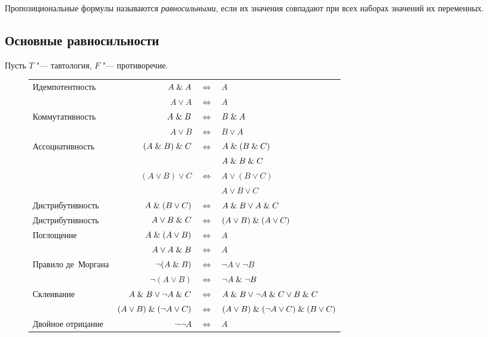 \begin{definition}
	Пропозициональные формулы называются \emph{равносильными}, если их значения совпадают при всех наборах значений их переменных.
\end{definition}

\subsection{Основные равносильности}

Пусть $ T $ "--- тавтология, $ F $ "--- противоречие.

\begin{figure}[!ht]
	\centering
	\begin{tabular}{l | r c l}
		Идемпотентность & $ A \mathrel\& A $ & $ \iff $ & $ A $ \\
						& $ A \vee A $ & $ \iff $ & $ A $ \\
		Коммутативность & $ A \mathrel\& B $ & $ \iff $ & $ B \mathrel\& A $ \\
						& $ A \vee B $ & $ \iff $ & $ B \vee A $ \\
		Ассоциативность & $ (A \mathrel\& B) \mathrel\& C $ & $ \iff $ & $ A \mathrel\& (B \mathrel\& C) $ \\
					   & 					 & 	   & $ A \mathrel\& B \mathrel\& C $ \\
					   & $ (A \vee B) \vee C $ & $ \iff $ & $ A \vee (B \vee C) $ \\
					   & 			   & 	 & $ A \vee B \vee C $ \\
		Дистрибутивность & $ A \mathrel\& (B \vee C) $ & $ \iff $ & $ A \mathrel\& B \vee A \mathrel\& C $ \\
		Дистрибутивность & $ A \vee B \mathrel\& C $ & $ \iff $ & $ (A \vee B) \mathrel\& (A \vee C) $ \\
		Поглощение & $ A \mathrel\& (A \vee B) $ & $ \iff $ & $ A $ \\
				   & $ A \vee A \mathrel\& B $ & $ \iff $ & $ A $ \\
		Правило де~Моргана & $ \neg (A \mathrel\& B) $ & $ \iff $ & $ \neg A \vee \neg B $ \\
						   & $ \neg (A \vee B) $ & $ \iff $ & $ \neg A \mathrel\& \neg B $ \\
		Склеивание & $ A \mathrel\& B \vee \neg A \mathrel\& C $ & $ \iff $ & $ A \mathrel\& B \vee \neg A \mathrel\& C \vee B \mathrel\& C $ \\
				   & $ (A \vee B) \mathrel\& (\neg A \vee C) $ & $ \iff $ & $ (A \vee B) \mathrel\& (\neg A \vee C) \mathrel\& (B \vee C) $ \\
		Двойное отрицание & $ \neg\neg A $ & $ \iff $ & $ A $ \\

\end{tabular}
\end{figure}
